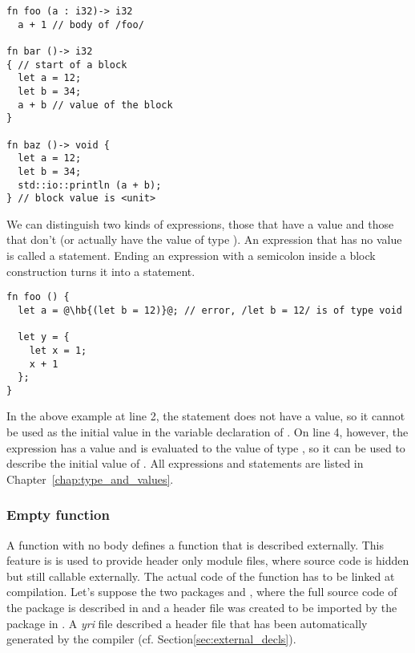 \begin{lstlisting}[style=coloredverbatim]
fn foo (a : i32)-> i32
  a + 1 // body of /foo/

fn bar ()-> i32
{ // start of a block
  let a = 12;
  let b = 34;
  a + b // value of the block
}

fn baz ()-> void {
  let a = 12;
  let b = 34;
  std::io::println (a + b);
} // block value is <unit>

\end{lstlisting}

We can distinguish two kinds of expressions, those that have a value and those
that don't (or actually have the value  of type ). An
expression that has no value is called a statement. Ending an expression with a
semicolon inside a block construction turns it into a statement.

\begin{lstlisting}[style=coloredverbatim, escapechar=@]
fn foo () {
  let a = @\hb{(let b = 12)}@; // error, /let b = 12/ is of type void

  let y = {
    let x = 1;
    x + 1
  };
}
\end{lstlisting}

In the above example at line 2, the statement  does not have
a value, so it cannot be used as the initial value in the variable declaration
of . On line 4, however, the expression 
has a value and is evaluated to the value  of type , so it
can be used to describe the initial value of . All expressions and
statements are listed in Chapter~\ref{chap:type_and_values}.

\subsubsection*{Empty function}

A function with no body defines a function that is described externally. This
feature is is used to provide header only module files, where source code is
hidden but still callable externally. The actual code of the function has to be
linked at compilation. Let's suppose the two packages  and
, where the full source code of the package  is
described in  and a header file was created to be
imported by the package  in . A
\textit{yri} file described a header file that has been automatically generated
by the compiler (cf. Section\ref{sec:external_decls}).


